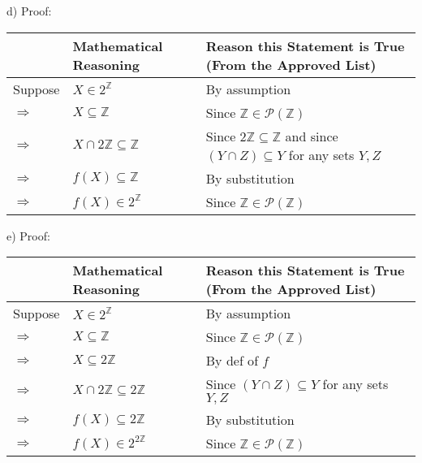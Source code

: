 \documentclass{article}
\begin{document}
d) Proof:
\begin{flushleft}
    \begin{tabular}{|p{1.3cm}|p{3.4cm}|p{5.8cm}|}
         \hline
          & \textbf{Mathematical Reasoning} & \textbf{Reason this Statement is True (From the Approved List)} \\
          \hline
          Suppose & $X\in 2^\mathbb{Z}$ & By assumption \\
          \hline
          $\Rightarrow$ & $X\subseteq \mathbb{Z}$ & Since $\mathbb{Z}\in \mathcal{P}(\mathbb{Z})$ \\
          \hline
          $\Rightarrow$ & $X\cap2\mathbb{Z} \subseteq \mathbb{Z}$ & Since $2\mathbb{Z}\subseteq\mathbb{Z}$ and since $(Y\cap Z)\subseteq Y$ for any sets $Y,Z$ \\
          \hline
          $\Rightarrow$ & $f(X)\subseteq\mathbb{Z}$ & By substitution \\
          \hline
          $\Rightarrow$ & $f(X)\in 2^\mathbb{Z}$ & Since $\mathbb{Z}\in \mathcal{P}(\mathbb{Z})$ \\
          \hline
    \end{tabular}
\end{flushleft}\vspace{10pt}\pagebreak

e) Proof:
\begin{flushleft}
    \begin{tabular}{|p{1.3cm}|p{3.4cm}|p{5.8cm}|}
         \hline
          & \textbf{Mathematical Reasoning} & \textbf{Reason this Statement is True (From the Approved List)} \\
          \hline
         Suppose & $X \in 2^\mathbb{Z}$ & By assumption \\
         \hline
         $\Rightarrow$ & $X\subseteq\mathbb{Z}$ & Since $\mathbb{Z}\in \mathcal{P}(\mathbb{Z})$\\
         \hline
         $\Rightarrow$ & $X\subseteq2\mathbb{Z}$ & By def of $f$\\
         \hline
         $\Rightarrow$ & $X\cap2\mathbb{Z}\subseteq 2\mathbb{Z}$ & Since $(Y\cap Z)\subseteq Y$ for any sets $Y,Z$\\
         \hline
         $\Rightarrow$ & $f(X)\subseteq2\mathbb{Z}$ & By substitution\\
         \hline
         $\Rightarrow$ & $f(X)\in2^{2\mathbb{Z}}$ & Since $\mathbb{Z}\in\mathcal{P}(\mathbb{Z})$ \\
         \hline

    \end{tabular}
\end{flushleft}
\end{document}

